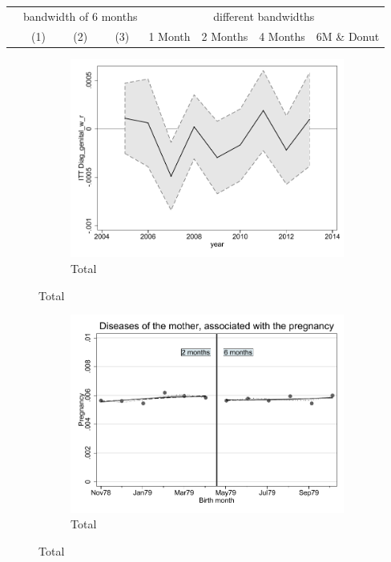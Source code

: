 \documentclass[a4paper ]{article}
\begin{document}
\begin{table}[h]\centering
\def\sym#1{\ifmmode^{#1}\else\(^{#1}\)\fi}
\begin{tabular}{l*{3}{c}|cccc}
\toprule
&\multicolumn{3}{c}{bandwidth of 6 months} & \multicolumn{4}{c}{different bandwidths} \\
 \cmidrule(lr{1em}){2-4} \cmidrule(lr{1em}){5-8}
 &\multicolumn{1}{c}{(1)}&\multicolumn{1}{c}{(2)}&\multicolumn{1}{c}{(3)}& 1 Month & 2 Months & 4 Months & 6M \& Donut \\
\midrule 

\bottomrule
\end{tabular}
\end{table}


\begin{figure}[h!]
	\centering
	\begin{subfigure}[t]{0.5\textwidth}
		\centering
		\includegraphics[width=0.99\textwidth]{R1_LC_Diag_genital_w_r}
		\caption{Total}		
	\end{subfigure}
\end{figure}
\newpage
\begin{figure}[h]
	\centering
	\begin{subfigure}[t]{0.5\textwidth}
		\centering
		\includegraphics[width=0.99\textwidth]{R1_RD_Pregnancy_fits}
		\caption{Total}		
	\end{subfigure}
\end{figure}
\end{document}
